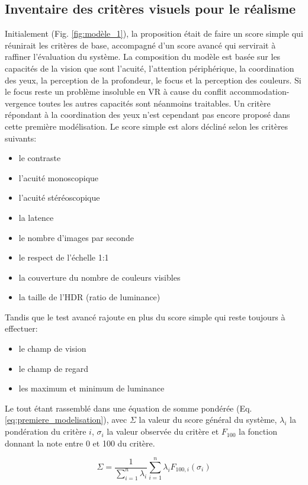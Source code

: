 	\subsection{Inventaire des critères visuels pour le réalisme}
	\par Initialement (Fig. \ref{fig:modèle_1}), la proposition était de faire un score simple qui réunirait les critères de base, accompagné d'un score avancé qui servirait à raffiner l'évaluation du système. La composition du modèle est basée sur les capacités de la vision que sont l'acuité, l'attention périphérique, la coordination des yeux, la perception de la profondeur, le focus et la perception des couleurs. Si le focus reste un problème insoluble en VR à cause du conflit accommodation-vergence toutes les autres capacités sont néanmoins traitables. Un critère répondant à la coordination des yeux n'est cependant pas encore proposé dans cette première modélisation. Le score simple est alors décliné selon les critères suivants:
	\begin{itemize}
		\item le contraste
		\item l'acuité monoscopique
		\item l'acuité stéréoscopique
		\item la latence
		\item le nombre d'images par seconde
		\item le respect de l'échelle 1:1
		\item la couverture du nombre de couleurs visibles
		\item la taille de l'HDR (ratio de luminance)
	\end{itemize}
	Tandis que le test avancé rajoute en plus du score simple qui reste toujours à effectuer:
	\begin{itemize}
		\item le champ de vision
		\item le champ de regard
		\item les maximum et minimum de luminance
	\end{itemize}
	Le tout étant rassemblé dans une équation de somme pondérée (Eq. \ref{eq:premiere_modelisation}), avec $\Sigma$ la valeur du score général du système, $\lambda_i$ la pondération du critère $i$, $\sigma_i$ la valeur observée du critère et $F_{100}$ la fonction donnant la note entre 0 et 100 du critère. 
	
	\begin{equation}
		\Sigma = \frac{1}{\sum_{i = 1}^{n} \lambda_i} \sum_{i = 1}^{n} \lambda_i F_{100,i}(\sigma_i)
		\label{eq:premiere_modelisation}
	\end{equation}
	
